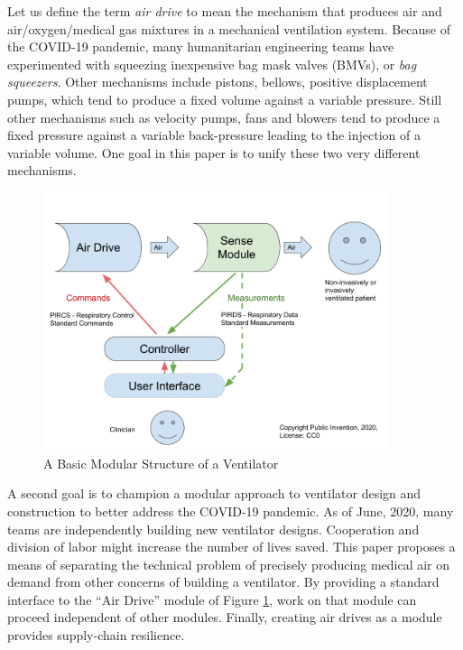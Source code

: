 \documentclass[conference]{article}
\begin{document}
Let us define the term {\em air drive} to mean the mechanism that
produces air and air/oxygen/medical gas mixtures in a mechanical
ventilation system. Because of the
COVID-19 pandemic, many humanitarian engineering teams have
experimented with squeezing inexpensive bag mask valves (BMVs), or
{\em bag squeezers}.
Other mechanisms include pistons, bellows,
positive displacement pumps, which tend to produce a fixed volume against
a variable pressure.
Still other mechanisms such as velocity pumps,
fans and blowers tend to produce a fixed
pressure against a variable back-pressure leading to the injection
of a variable volume. One goal in this paper is to unify these
two very different mechanisms.



\begin{figure}
\begin{center}
\includegraphics[width=0.9\textwidth]{figures/BasicModules.png}
\caption{A Basic Modular Structure of a Ventilator}
\end{center}
\label{fig:basicmodules}
\end{figure}

A second goal is to champion a modular approach to ventilator design
and construction to better address the COVID-19 pandemic. As of June, 2020,
many teams are independently building new ventilator designs. Cooperation
and division of labor might increase the number of lives saved.
This paper proposes a means of separating the technical problem of precisely
producing medical air on demand from other concerns of building a ventilator.
By providing a standard interface to the ``Air Drive'' module of Figure \ref{fig:basicmodules},
work on that module can proceed independent of other modules.
Finally, creating air drives as a module provides supply-chain resilience.
\end{document}
